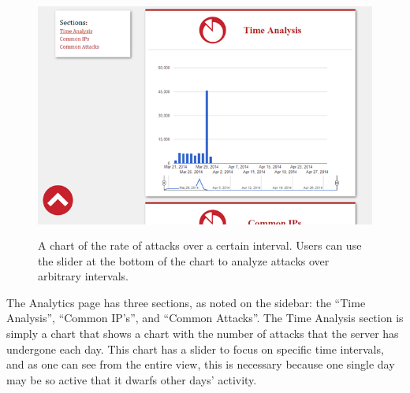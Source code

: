 \documentclass[12pt,letterpaper,titlepage]{report}
\begin{document}
{\begin{figure}[b!]
\centering
  \includegraphics[height=8cm]{./timeanalysis.png}
  \caption{A chart of the rate of attacks over a certain interval. Users
  can use the slider at the bottom of the chart to analyze attacks over
  arbitrary intervals.}
\end{figure}

The Analytics page has three sections, as noted on the sidebar: the “Time
Analysis”, “Common IP’s”, and “Common Attacks”. The Time Analysis section is
simply a chart that shows a chart with the number of attacks that the server has
undergone each day. This chart has a slider to focus on specific time intervals,
and as one can see from the entire view, this is necessary because one single
day may be so active that it dwarfs other days’ activity.


}
\end{document}
